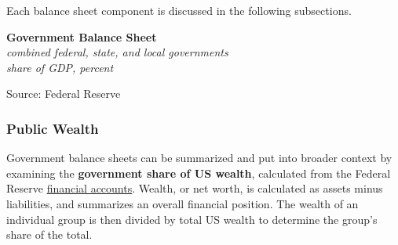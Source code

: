 \documentclass{report}
\makeatletter
\newcommand{\tbllink}[1]{\href{https://raw.githubusercontent.com/bdecon/US-chartbook/master/chartbook/data/#1}{\faTable}}
\newcommand*\short[1]{\expandafter\@gobbletwo\number\numexpr#1\relax}
\newcommand{\absnode}[3]{\node[below right, align=left] at (axis cs: #1,#2) {#3};}
\newcommand{\shdateaxisticks}{
		date coordinates in=x, axis line style={draw=none},
		xmax={2024-01-31},
		max space between ticks=40,	    
		xtick={{1990-01-01}, {1995-01-01}, {2000-01-01}, 
			{2005-01-01}, {2010-01-01}, {2015-01-01}, {2020-01-01}},
		minor xtick={},
		enlarge y limits={0.06}, enlarge x limits={0.01},
		xticklabel style={align=center, yshift=-2pt}, tick label style={inner sep=0pt},
		}
\newcommand{\bbar}[2]{extra #1 ticks = {{#2}}, extra #1 tick labels = ,
		extra #1 tick style = {grid=major, grid style={thick, black!25}},}
\newcommand{\thickline}[4]{\addplot[ultra thick, no markers, color=#1] 
		table [x=#2, y=#3, col sep=comma] {#4};	}
\newcommand{\rbars}{
		\fill[color=black!10] (axis cs:{1990-07-01},\pgfkeysvalueof{/pgfplots/ymin})
			rectangle (axis cs:{1991-03-01}, \pgfkeysvalueof{/pgfplots/ymax});
		\fill[color=black!10] (axis cs:{2007-12-01},\pgfkeysvalueof{/pgfplots/ymin})
			rectangle (axis cs:{2009-07-01}, \pgfkeysvalueof{/pgfplots/ymax});
		\fill[color=black!10] (axis cs:{2001-03-01},\pgfkeysvalueof{/pgfplots/ymin})
			rectangle (axis cs:{2001-11-01}, \pgfkeysvalueof{/pgfplots/ymax});
		\fill[color=black!10] (axis cs:{2020-02-01},\pgfkeysvalueof{/pgfplots/ymin})
			rectangle (axis cs:{2020-05-01}, \pgfkeysvalueof{/pgfplots/ymax});}
\makeatother
\begin{document}
{\begin{minipage}{0.35\textwidth}
\small  Each balance sheet component is discussed in the following subsections.
\end{minipage}\hspace{6mm}\begin{minipage}{0.37\textwidth}
\normalsize \textbf{Government Balance Sheet}\\
\footnotesize{\textit{combined federal, state, and local governments }}\\
\footnotesize{\textit{share of GDP, percent}}
\vspace{4.3cm}

\hspace{4mm} 

\footnotesize{Source: Federal Reserve} \hfill \tbllink{gov_bs_summary.csv}
\end{minipage} 
\vspace{1mm}

\begin{minipage}{1.0\textwidth}
\subsubsection*{Public Wealth}
\vspace*{-1mm}

\small Government balance sheets can be summarized and put into broader context by examining the \textbf{government share of US wealth}, calculated from the Federal Reserve \href{https://www.federalreserve.gov/releases/z1/}{financial accounts}. Wealth, or net worth, is calculated as assets minus liabilities, and summarizes an overall financial position. The wealth of an individual group is then divided by total US wealth to determine the group's share of the total.


\end{minipage}}
\end{document}
